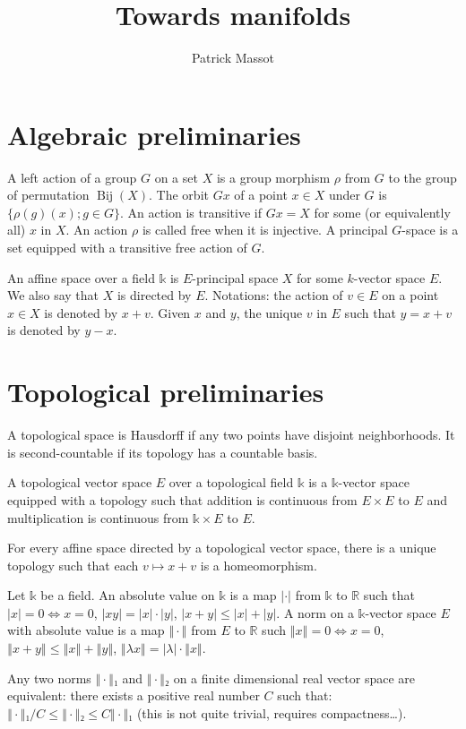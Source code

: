 \documentclass{article}
\title{Towards manifolds}
\author{Patrick Massot}
\DeclareMathOperator{\Bij}{Bij}
\renewcommand{\k}{\mathbb{k}}
\begin{document}
\maketitle

\section{Algebraic preliminaries}
\label{sec:algebraic_preliminaries}

A left action of a group $G$ on a set $X$ is a group morphism $ρ$ from $G$
to the group of permutation $\Bij(X)$. The orbit $Gx$ of a point $x ∈ X$
under $G$ is $\{ ρ(g)(x); g ∈ G\}$. An action is transitive if 
$Gx = X$ for some (or equivalently all) $x$ in $X$. An action $ρ$ is
called free when it is injective. A principal $G$-space is a set
equipped with a transitive free action of $G$.

An affine space over a field $\k$ is $E$-principal space $X$ for some
$k$-vector space $E$. We also say that $X$ is directed by $E$.
Notations: the action of $v ∈ E$ on a point 
$x ∈ X$ is denoted by $x + v$. Given $x$ and $y$, the unique $v$ in $E$
such that $y = x + v$ is denoted by $y - x$.

\section{Topological preliminaries}
\label{sec:topological_preliminaries}

A topological space is Hausdorff if any two points have disjoint
neighborhoods. It is second-countable if its topology has a countable
basis.

A topological vector space $E$ over a topological field $\k$ is a
$\k$-vector space equipped with a topology such that addition is
continuous from $E × E$ to $E$ and multiplication is continuous from 
$\k × E$ to $E$.

For every affine space directed by a topological vector space, there is
a unique topology such that each $v ↦ x + v$ is a homeomorphism.

Let $\k$ be a field. An absolute value on $\k$ is a map $|·|$ from 
$\k$ to $ℝ$ such that $|x| = 0 ⇔ x = 0$, $|xy|= |x|·|y|$, 
$|x + y| ≤ |x| + |y|$.
A norm on a $\k$-vector space $E$ with absolute value is a map $‖·‖$
from $E$ to $ℝ$ such $‖x‖ = 0 ⇔ x = 0$, $‖x + y‖ ≤ ‖x‖ + ‖y‖$, 
$‖λ x‖ =|λ| · ‖x‖$.

Any two norms $‖·‖₁$ and $‖·‖₂$ on a finite dimensional real
vector space are equivalent: there exists a positive real number $C$
such that: $‖·‖₁/C ≤ ‖·‖₂ ≤ C‖·‖₁$ (this is not quite trivial, requires
compactness…).
\end{document}
